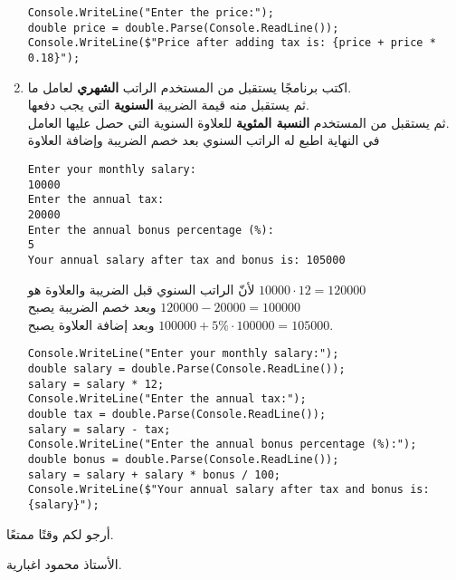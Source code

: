 ﻿\documentclass[12pt]{article}
\begin{document}
\begin{enumerate}
\ifwithsols
\begin{boxSolution}
\begin{english}
\begin{verbatim}
Console.WriteLine("Enter the price:");
double price = double.Parse(Console.ReadLine());
Console.WriteLine($"Price after adding tax is: {price + price * 0.18}");
\end{verbatim}
\end{english}
\end{boxSolution}

\fi

\clearpage

\item
اكتب برنامجًا يستقبل من المستخدم الراتب \textbf{الشهري} لعامل ما. \\
ثم يستقبل منه قيمة الضريبة \textbf{السنوية} التي يجب دفعها. \\
ثم يستقبل من المستخدم \textbf{النسبة المئوية} للعلاوة السنوية التي حصل عليها العامل. \\
في النهاية اطبع له الراتب السنوي بعد خصم الضريبة وإضافة العلاوة
\begin{boxExample}
\begin{english}
\begin{verbatim}
Enter your monthly salary:
10000
Enter the annual tax:
20000
Enter the annual bonus percentage (%):
5
Your annual salary after tax and bonus is: 105000
\end{verbatim}
\end{english}
لأنّ الراتب السنوي قبل الضريبة والعلاوة هو $10000 \cdot 12 = 120000$ \\
وبعد خصم الضريبة يصبح $120000 - 20000 = 100000$ \\
وبعد إضافة العلاوة يصبح $100000 + 5\% \cdot 100000 = 105000$.
\end{boxExample}

\ifwithsols
\begin{boxSolution}
\begin{english}
\begin{verbatim}
Console.WriteLine("Enter your monthly salary:");
double salary = double.Parse(Console.ReadLine());
salary = salary * 12;
Console.WriteLine("Enter the annual tax:");
double tax = double.Parse(Console.ReadLine());
salary = salary - tax;
Console.WriteLine("Enter the annual bonus percentage (%):");
double bonus = double.Parse(Console.ReadLine());
salary = salary + salary * bonus / 100;
Console.WriteLine($"Your annual salary after tax and bonus is: {salary}");
\end{verbatim}
\end{english}
\end{boxSolution}

\fi

\end{enumerate}

\vspace{3cm}
\begin{flushleft}
أرجو لكم وقتًا ممتعًا.

الأستاذ محمود اغبارية.
\end{flushleft}
\end{document}
